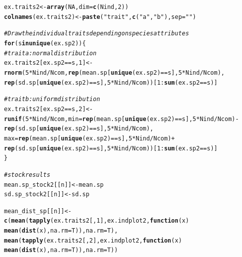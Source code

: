 \documentclass[12pt]{article}\usepackage[]{graphicx}\usepackage[]{color}
\makeatletter
\newcommand{\hlnum}[1]{\textcolor[rgb]{0.686,0.059,0.569}{#1}}%
\newcommand{\hlstr}[1]{\textcolor[rgb]{0.192,0.494,0.8}{#1}}%
\newcommand{\hlcom}[1]{\textcolor[rgb]{0.678,0.584,0.686}{\textit{#1}}}%
\newcommand{\hlopt}[1]{\textcolor[rgb]{0,0,0}{#1}}%
\newcommand{\hlstd}[1]{\textcolor[rgb]{0.345,0.345,0.345}{#1}}%
\newcommand{\hlkwa}[1]{\textcolor[rgb]{0.161,0.373,0.58}{\textbf{#1}}}%
\newcommand{\hlkwb}[1]{\textcolor[rgb]{0.69,0.353,0.396}{#1}}%
\newcommand{\hlkwc}[1]{\textcolor[rgb]{0.333,0.667,0.333}{#1}}%
\newcommand{\hlkwd}[1]{\textcolor[rgb]{0.737,0.353,0.396}{\textbf{#1}}}%
\newenvironment{kframe}{%
 \def\at@end@of@kframe{}%
 \ifinner\ifhmode%
  \def\at@end@of@kframe{\end{minipage}}%
  \begin{minipage}{\columnwidth}%
 \fi\fi%
 \def\FrameCommand##1{\hskip\@totalleftmargin \hskip-\fboxsep
 \colorbox{shadecolor}{##1}\hskip-\fboxsep
     \hskip-\linewidth \hskip-\@totalleftmargin \hskip\columnwidth}%
 \MakeFramed {\advance\hsize-\width
   \@totalleftmargin\z@ \linewidth\hsize
   \@setminipage}}%
 {\par\unskip\endMakeFramed%
 \at@end@of@kframe}
\newenvironment{knitrout}{}{} %
\makeatother
\begin{document}
\begin{knitrout}
\begin{kframe}
\begin{alltt}
 \hlstd{ex.traits2} \hlkwb{<-} \hlkwd{array}\hlstd{(}\hlnum{NA}\hlstd{,} \hlkwc{dim} \hlstd{=} \hlkwd{c}\hlstd{(Nind,} \hlnum{2}\hlstd{))}
 \hlkwd{colnames}\hlstd{(ex.traits2)} \hlkwb{<-} \hlkwd{paste}\hlstd{(}\hlstr{"trait"}\hlstd{,} \hlkwd{c}\hlstd{(}\hlstr{"a"}\hlstd{,} \hlstr{"b"}\hlstd{),} \hlkwc{sep} \hlstd{=} \hlstr{" "}\hlstd{)}

 \hlcom{# Draw the individual traits depending on species attributes}
  \hlkwa{for}\hlstd{(s} \hlkwa{in} \hlkwd{unique}\hlstd{(ex.sp2))\{}
   \hlcom{#trait a : normal distribution}
   \hlstd{ex.traits2[ex.sp2} \hlopt{==} \hlstd{s,} \hlnum{1}\hlstd{]} \hlkwb{<-}
   \hlkwd{rnorm}\hlstd{(}\hlnum{5}\hlopt{*}\hlstd{Nind}\hlopt{/}\hlstd{Ncom,} \hlkwd{rep}\hlstd{(mean.sp[}\hlkwd{unique}\hlstd{(ex.sp2)} \hlopt{==} \hlstd{s],} \hlnum{5}\hlopt{*}\hlstd{Nind}\hlopt{/}\hlstd{Ncom),}
         \hlkwd{rep}\hlstd{(sd.sp[}\hlkwd{unique}\hlstd{(ex.sp2)} \hlopt{==} \hlstd{s],} \hlnum{5}\hlopt{*}\hlstd{Nind}\hlopt{/}\hlstd{Ncom))[}\hlnum{1}\hlopt{:}\hlkwd{sum}\hlstd{(ex.sp2} \hlopt{==} \hlstd{s)]}

   \hlcom{#trait b : uniform distribution}
   \hlstd{ex.traits2[ex.sp2} \hlopt{==} \hlstd{s,} \hlnum{2}\hlstd{]} \hlkwb{<-}
   \hlkwd{runif}\hlstd{(}\hlnum{5}\hlopt{*}\hlstd{Nind}\hlopt{/}\hlstd{Ncom,} \hlkwc{min} \hlstd{=} \hlkwd{rep}\hlstd{(mean.sp[}\hlkwd{unique}\hlstd{(ex.sp2)} \hlopt{==} \hlstd{s],} \hlnum{5}\hlopt{*}\hlstd{Nind}\hlopt{/}\hlstd{Ncom)} \hlopt{-}
         \hlkwd{rep}\hlstd{(sd.sp[}\hlkwd{unique}\hlstd{(ex.sp2)} \hlopt{==} \hlstd{s],} \hlnum{5}\hlopt{*}\hlstd{Nind}\hlopt{/}\hlstd{Ncom),}
         \hlkwc{max} \hlstd{=} \hlkwd{rep}\hlstd{(mean.sp[}\hlkwd{unique}\hlstd{(ex.sp2)} \hlopt{==} \hlstd{s],} \hlnum{5}\hlopt{*}\hlstd{Nind}\hlopt{/}\hlstd{Ncom)} \hlopt{+}
         \hlkwd{rep}\hlstd{(sd.sp[}\hlkwd{unique}\hlstd{(ex.sp2)} \hlopt{==} \hlstd{s],} \hlnum{5}\hlopt{*}\hlstd{Nind}\hlopt{/}\hlstd{Ncom))[}\hlnum{1}\hlopt{:}\hlkwd{sum}\hlstd{(ex.sp2} \hlopt{==} \hlstd{s)]}
  \hlstd{\}}

 \hlcom{#stock results}
 \hlstd{mean.sp_stock2[[n]]} \hlkwb{<-} \hlstd{mean.sp}
 \hlstd{sd.sp_stock2[[n]]} \hlkwb{<-} \hlstd{sd.sp}

 \hlstd{mean_dist_sp[[n]]} \hlkwb{<-} \hlkwd{c}\hlstd{(}\hlkwd{mean}\hlstd{(}\hlkwd{tapply}\hlstd{(ex.traits2[,} \hlnum{1}\hlstd{], ex.indplot2,} \hlkwa{function}\hlstd{(}\hlkwc{x}\hlstd{)}
                                    \hlkwd{mean}\hlstd{(}\hlkwd{dist}\hlstd{(x),} \hlkwc{na.rm}\hlstd{=T)),} \hlkwc{na.rm}\hlstd{=T),}
                        \hlkwd{mean}\hlstd{(}\hlkwd{tapply}\hlstd{(ex.traits2[,} \hlnum{2}\hlstd{], ex.indplot2,} \hlkwa{function}\hlstd{(}\hlkwc{x}\hlstd{)}
                                    \hlkwd{mean}\hlstd{(}\hlkwd{dist}\hlstd{(x),} \hlkwc{na.rm}\hlstd{=T)),} \hlkwc{na.rm}\hlstd{=T))}


\end{alltt}
\end{kframe}
\end{knitrout}
\end{document}
